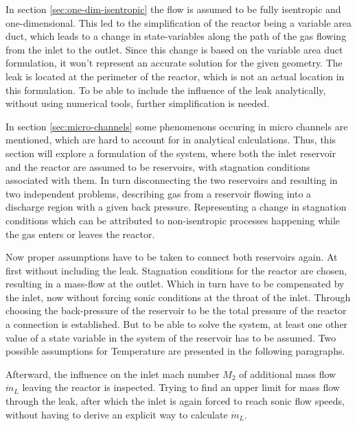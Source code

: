 In section \ref{sec:one-dim-isentropic} the flow is assumed to be fully isentropic and one-dimensional.
This led to the simplification of the reactor being a variable area duct, which leads to a change in state-variables along the path of the gas flowing from the inlet to the outlet.
Since this change is based on the variable area duct formulation, it won't represent an accurate solution for the given geometry.
The leak is located at the perimeter of the reactor, which is not an actual location in this formulation.
To be able to include the influence of the leak analytically, without using numerical tools, further simplification is needed.

In section \ref{sec:micro-channels} some phenomenons occuring in micro channels are mentioned, which are hard to account for in analytical calculations.
Thus, this section will explore a formulation of the system, where both the inlet reservoir and the reactor are assumed to be reservoirs, with stagnation conditions associated with them.
In turn disconnecting the two reservoirs and resulting in two independent problems, describing gas from a reservoir flowing into a discharge region with a given back pressure. 
Representing a change in stagnation conditions which can be attributed to non-isentropic processes happening while the gas enters or leaves the reactor.

Now proper assumptions have to be taken to connect both reservoirs again.
At first without including the leak.
Stagnation conditions for the reactor are chosen, resulting in a mass-flow at the outlet.
Which in turn have to be compensated by the inlet, now without forcing sonic conditions at the throat of the inlet.
Through choosing the back-pressure of the reservoir to be the total pressure of the reactor a connection is established.
But to be able to solve the system, at least one other value of a state variable in the system of the reservoir has to be assumed.
Two possible assumptions for Temperature are presented in the following paragraphs.

Afterward, the influence on the inlet mach number $M_2$ of additional mass flow $\dot{m}_L$ leaving the reactor is inspected.
Trying to find an upper limit for mass flow through the leak, after which the inlet is again forced to reach sonic flow speeds, without having to derive an explicit way to calculate $\dot{m}_L$.

